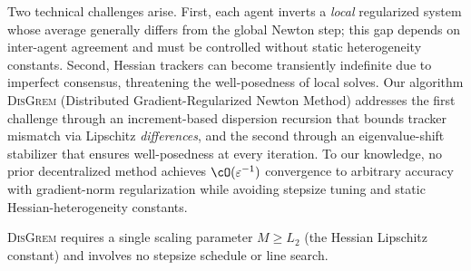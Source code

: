 \documentclass[review,onefignum,onetabnum]{siamart171218}
\begin{document}
	Two technical challenges arise.
	First, each agent inverts a \emph{local} regularized system whose
	average generally differs from the global Newton step; this gap
	depends on inter-agent agreement and must be controlled without
	static heterogeneity constants.
	Second, Hessian trackers can become transiently indefinite due to
	imperfect consensus, threatening the well-posedness of local solves.
	Our algorithm \textsc{DisGrem} (Distributed Gradient-Regularized
	Newton Method) addresses the first challenge through an increment-based
	dispersion recursion that bounds tracker mismatch via Lipschitz
	\emph{differences}, and the second through an eigenvalue-shift
	stabilizer that ensures well-posedness at every iteration.
	To our knowledge, no prior decentralized method achieves
	$\cO(\varepsilon^{-1})$ convergence to arbitrary accuracy
	with gradient-norm regularization while avoiding stepsize tuning and
	static Hessian-heterogeneity constants.
	
\textsc{DisGrem} requires a single scaling parameter
$M\ge L_2$ (the Hessian Lipschitz constant) and involves no stepsize schedule or line search.
\end{document}
